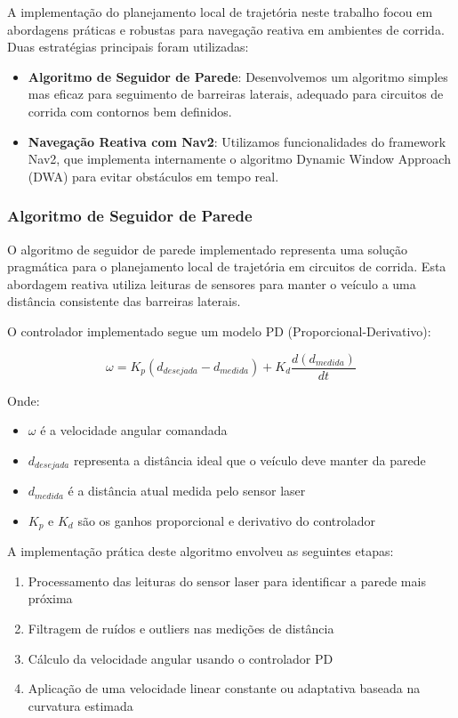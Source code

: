 A implementação do planejamento local de trajetória neste trabalho focou em
abordagens práticas e robustas para navegação reativa em ambientes de corrida.
Duas estratégias principais foram utilizadas:

\begin{itemize}
    \item \textbf{Algoritmo de Seguidor de Parede}: Desenvolvemos um algoritmo simples mas eficaz para seguimento de barreiras laterais, adequado para circuitos de corrida com contornos bem definidos.

    \item \textbf{Navegação Reativa com Nav2}: Utilizamos funcionalidades do framework Nav2, que implementa internamente o algoritmo Dynamic Window Approach (DWA) para evitar obstáculos em tempo real.
\end{itemize}

\subsubsection{Algoritmo de Seguidor de Parede}

O algoritmo de seguidor de parede implementado representa uma solução
pragmática para o planejamento local de trajetória em circuitos de corrida.
Esta abordagem reativa utiliza leituras de sensores para manter o veículo a uma
distância consistente das barreiras laterais.

O controlador implementado segue um modelo PD (Proporcional-Derivativo):

\begin{equation}
    \omega = K_p(d_{desejada} - d_{medida}) + K_d\frac{d(d_{medida})}{dt}
    \label{eq:wall_follower_control}
\end{equation}

Onde:
\begin{itemize}
    \item $\omega$ é a velocidade angular comandada
    \item $d_{desejada}$ representa a distância ideal que o veículo deve manter da parede
    \item $d_{medida}$ é a distância atual medida pelo sensor laser
    \item $K_p$ e $K_d$ são os ganhos proporcional e derivativo do controlador
\end{itemize}

A implementação prática deste algoritmo envolveu as seguintes etapas:

\begin{enumerate}
    \item Processamento das leituras do sensor laser para identificar a parede mais
          próxima
    \item Filtragem de ruídos e outliers nas medições de distância
    \item Cálculo da velocidade angular usando o controlador PD
    \item Aplicação de uma velocidade linear constante ou adaptativa baseada na curvatura
          estimada
\end{enumerate}

